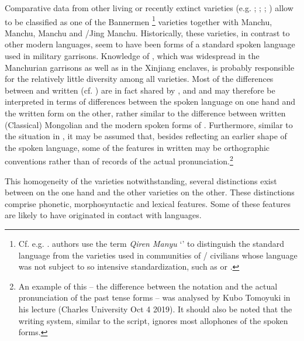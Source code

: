 \documentclass[output=paper,colorlinks,citecolor=brown]{langscibook}
\begin{document}
Comparative data from other living or recently extinct  varieties (e.g. \citealt{WangQingfeng2005Z}; \citealt{ZhaoJie1989Z}; \citealt{MuYejun1985Z, MuYejun1986Za, MuYejun1986Zb, MuYejun1987Z, MuYejun1988Z}; \citealt{HölzlHölzl2019a}) allow  to be classified as one of the Bannermen \footnote{Cf. e.g. \citet{ZhaoJie1989Z}.  authors use the term \textit{Qiren Manyu} ‘’ to distinguish the standard  language from the varieties used in communities of / civilians whose language was not subject to so intensive standardization, such as  or .} varieties together with  Manchu,  Manchu,  Manchu and /Jing Manchu. Historically, these varieties, in contrast to other modern  languages, seem to have been forms of a standard spoken language used in  military garrisons. Knowledge of , which was widespread in the Manchurian garrisons as well as in the Xinjiang  enclaves, is probably responsible for the relatively little diversity among all  varieties. Most of the differences between  and written  (cf. \citealt{Jang2008}) are in fact shared by ,  and  and may therefore be interpreted in terms of differences between the spoken language on one hand and the written form on the other, rather similar to the difference between written (Classical) Mongolian and the modern spoken forms of . Furthermore, similar to the situation in , it may be assumed that, besides reflecting an earlier shape of the spoken language, some of the features in written  may be orthographic conventions rather than of records of the actual pronunciation.\footnote{An example of this – the difference between the notation and the actual pronunciation of the  past tense forms – was analysed by Kubo Tomoyuki in his lecture (Charles University Oct 4 2019). It should also be noted that the  writing system, similar to the  script, ignores most allophones of the spoken forms.}

This homogeneity of the  varieties notwithstanding, several distinctions exist between  on the one hand and the other  varieties on the other. These distinctions comprise phonetic, morphosyntactic and lexical features. Some of these features are likely to have originated in contact with  languages.
\end{document}
